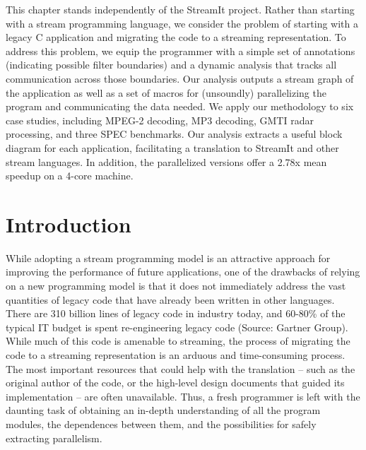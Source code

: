 \newcommand{\meanspeedup}[0]{2.78x}

\label{chap:profiling}

This chapter stands independently of the StreamIt project.  Rather
than starting with a stream programming language, we consider the
problem of starting with a legacy C application and migrating the code
to a streaming representation.  To address this problem, we equip the
programmer with a simple set of annotations (indicating possible
filter boundaries) and a dynamic analysis that tracks all
communication across those boundaries.  Our analysis outputs a stream
graph of the application as well as a set of macros for (unsoundly)
parallelizing the program and communicating the data needed.  We apply
our methodology to six case studies, including MPEG-2 decoding, MP3
decoding, GMTI radar processing, and three SPEC benchmarks.  Our
analysis extracts a useful block diagram for each application,
facilitating a translation to StreamIt and other stream languages.  In
addition, the parallelized versions offer a {\meanspeedup} mean
speedup on a 4-core machine.

\section{Introduction}

While adopting a stream programming model is an attractive approach
for improving the performance of future applications, one of the
drawbacks of relying on a new programming model is that it does not
immediately address the vast quantities of legacy code that have
already been written in other languages.  There are 310 billion lines
of legacy code in industry today, and 60-80\% of the typical IT budget
is spent re-engineering legacy code (Source: Gartner Group).  While
much of this code is amenable to streaming, the process of migrating
the code to a streaming representation is an arduous and
time-consuming process.  The most important resources that could help
with the translation -- such as the original author of the code, or
the high-level design documents that guided its implementation -- are
often unavailable.  Thus, a fresh programmer is left with the daunting
task of obtaining an in-depth understanding of all the program
modules, the dependences between them, and the possibilities for
safely extracting parallelism.

